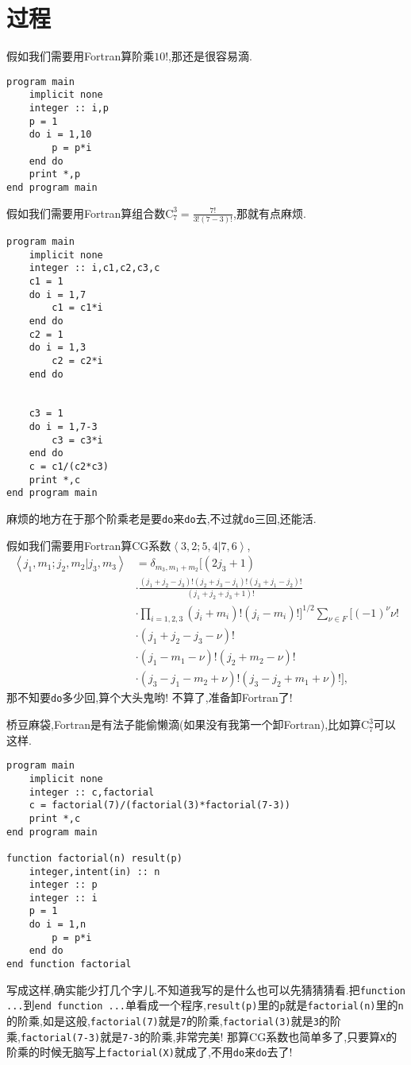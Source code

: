 \chapter{过程}\label{fortran_procedure}

假如我们需要用Fortran算阶乘$10!$,那还是很容易滴.
\begin{lstlisting}
program main
    implicit none
    integer :: i,p
    p = 1
    do i = 1,10
        p = p*i
    end do
    print *,p
end program main
\end{lstlisting}

假如我们需要用Fortran算组合数$\text{C}_7^3=\frac{7!}{3!(7-3)!}$,那就有点麻烦.
\begin{lstlisting}
program main
    implicit none
    integer :: i,c1,c2,c3,c
    c1 = 1
    do i = 1,7
        c1 = c1*i
    end do
    c2 = 1
    do i = 1,3
        c2 = c2*i
    end do


    c3 = 1
    do i = 1,7-3
        c3 = c3*i
    end do
    c = c1/(c2*c3)
    print *,c
end program main
\end{lstlisting}
麻烦的地方在于那个阶乘老是要\texttt{do}来\texttt{do}去,不过就\texttt{do}三回,还能活.

假如我们需要用Fortran算CG系数$\left\langle 3,2;5,4|7,6\right\rangle $,
\begin{align*}
    \left\langle j_1,m_1;j_2,m_2|j_3,m_3\right\rangle&=\delta_{m_3,m_1+m_2}\Big[(2j_3+1)\\
    &\cdot\frac{(j_1+j_2-j_3)!(j_2+j_3-j_1)!(j_3+j_1-j_2)!}{(j_1+j_2+j_3+1)!}
    \\
    &\cdot\prod_{i=1,2,3}(j_i+m_i)!(j_i-m_i)!\Big]^{1/2}\sum_{\nu\in F}[(-1)^{\nu}\nu!\\
    &\cdot(j_1+j_2-j_3-\nu)!\\
    &\cdot(j_1-m_1-\nu)!(j_2+m_2-\nu)!\\
    &\cdot(j_3-j_1-m_2+\nu)!(j_3-j_2+m_1+\nu)!],
\end{align*}
那不知要\texttt{do}多少回,算个大头鬼哟! 不算了,准备卸Fortran了!

桥豆麻袋,Fortran是有法子能偷懒滴(如果没有我第一个卸Fortran),比如算$\text{C}_7^3$可以这样.
\begin{lstlisting}
program main
    implicit none
    integer :: c,factorial
    c = factorial(7)/(factorial(3)*factorial(7-3))
    print *,c
end program main

function factorial(n) result(p)
    integer,intent(in) :: n
    integer :: p
    integer :: i 
    p = 1
    do i = 1,n
        p = p*i
    end do
end function factorial
\end{lstlisting}
写成这样,确实能少打几个字儿.不知道我写的是什么也可以先猜猜猜看.把\texttt{function ...}到\texttt{end function ...}单看成一个程序,\texttt{result(p)}里的\texttt{p}就是\texttt{factorial(n)}里的\texttt{n}的阶乘,如是这般,\texttt{factorial(7)}就是\texttt{7}的阶乘,\texttt{factorial(3)}就是\texttt{3}的阶乘,\texttt{factorial(7-3)}就是\texttt{7-3}的阶乘,非常完美! 那算CG系数也简单多了,只要算\texttt{X}的阶乘的时候无脑写上\texttt{factorial(X)}就成了,不用\texttt{do}来\texttt{do}去了!

